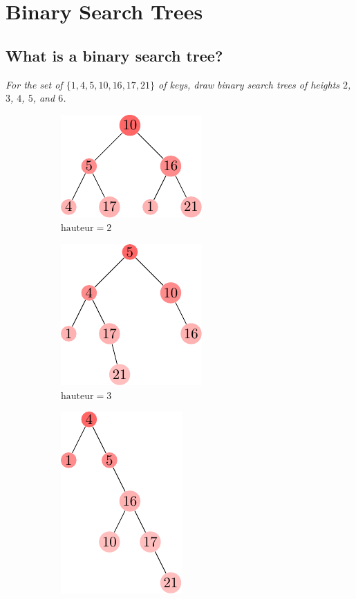 \section{Binary Search Trees}

\subsection{What is a binary search tree?}

\begin{description}
 \textit{For the set of $\{1, 4, 5, 10, 16, 17, 21\}$ of keys, draw binary search trees of heights $2$, $3$, $4$, $5$, and $6$.}

\begin{ex}
    \begin{figure}[H]
      \centering
      \begin{subfigure}[t]{.45\textwidth}
        \centering
        \includegraphics[scale=1]{img/12_1-1/12_1-1_1.pdf}
        \caption{$\text{hauteur} = 2 $}\label{fig:12_1-1_1}
      \end{subfigure}
      \begin{subfigure}[t]{.45\textwidth}
        \centering
        \includegraphics[scale=1]{img/12_1-1/12_1-1_2.pdf}
        \caption{$\text{hauteur} = 3 $}\label{fig:12_1-1_2}
      \end{subfigure}
      \begin{subfigure}[t]{.30\textwidth}
        \centering
        \includegraphics[scale=1]{img/12_1-1/12_1-1_3.pdf}

\end{subfigure}
\end{figure}
\end{ex}
\end{description}
